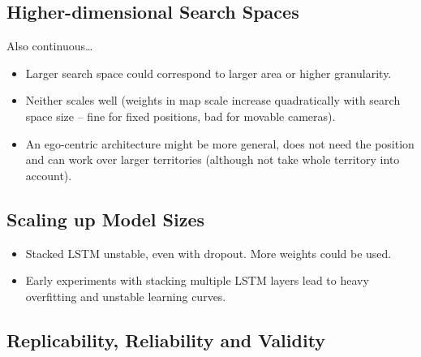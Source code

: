 

\subsection{Higher-dimensional Search Spaces}

Also continuous\dots

\begin{itemize}
    \item Larger search space could correspond to larger area or higher granularity.
    \item Neither scales well (weights in map scale increase quadratically with search space size -- fine for fixed positions, bad for movable cameras).
    \item An ego-centric architecture might be more general, does not need the position and can work over larger territories (although not take whole territory into account).
\end{itemize}


\subsection{Scaling up Model Sizes}

\begin{itemize}
    \item Stacked LSTM unstable, even with dropout. More weights could be used.
    \item Early experiments with stacking multiple LSTM layers lead to heavy overfitting and unstable learning curves.
\end{itemize}

\subsection{Replicability, Reliability and Validity}

